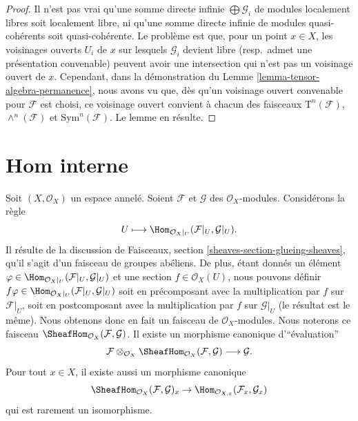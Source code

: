 \begin{proof}
Il n'est pas vrai qu'une somme directe infinie $\bigoplus \mathcal{G}_i$ de
modules localement libres soit localement libre, ni qu'une
somme directe infinie de modules quasi-cohérents
soit quasi-cohérente. Le problème est que, pour un
point $x \in X$, les voisinages ouverts $U_i$ de $x$ sur lesquels $\mathcal{G}_i$
devient libre (resp.\ admet une présentation convenable) peuvent avoir une intersection
qui n'est pas un voisinage ouvert de $x$. Cependant, dans la
démonstration du Lemme \ref{lemma-tensor-algebra-permanence}, nous avons vu que,
dès qu'un voisinage ouvert convenable pour $\mathcal{F}$ est choisi,
ce voisinage ouvert convient à chacun des faisceaux
$\text{T}^n(\mathcal{F})$, $\wedge^n(\mathcal{F})$ et
$\text{Sym}^n(\mathcal{F})$.
Le lemme en résulte.
\end{proof}







\section{Hom interne}
\label{section-internal-hom}

\noindent
Soit $(X, \mathcal{O}_X)$ un espace annelé.
Soient $\mathcal{F}$ et $\mathcal{G}$ des $\mathcal{O}_X$-modules.
Considérons la règle
$$
U \longmapsto \Hom_{\mathcal{O}_X|_U}(\mathcal{F}|_U, \mathcal{G}|_U).
$$
Il résulte de la discussion de Faisceaux, section
\ref{sheaves-section-glueing-sheaves}, qu'il s'agit d'un faisceau de
groupes abéliens. De plus, étant donnés un élément
$\varphi \in \Hom_{\mathcal{O}_X|_U}(\mathcal{F}|_U, \mathcal{G}|_U)$
et une section $f \in \mathcal{O}_X(U)$, nous pouvons définir
$f\varphi \in \Hom_{\mathcal{O}_X|_U}(\mathcal{F}|_U, \mathcal{G}|_U)$
soit en précomposant avec la multiplication par $f$ sur $\mathcal{F}|_U$,
soit en postcomposant avec la multiplication par $f$ sur $\mathcal{G}|_U$ (le résultat
est le même). Nous obtenons donc en fait un faisceau de $\mathcal{O}_X$-modules.
Nous noterons ce faisceau
$\SheafHom_{\mathcal{O}_X}(\mathcal{F}, \mathcal{G})$.
Il existe un morphisme canonique d'``évaluation''
$$
\mathcal{F}
\otimes_{\mathcal{O}_X}
\SheafHom_{\mathcal{O}_X}(\mathcal{F}, \mathcal{G})
\longrightarrow
\mathcal{G}.
$$
Pour tout $x \in X$, il existe aussi un morphisme canonique
$$
\SheafHom_{\mathcal{O}_X}(\mathcal{F}, \mathcal{G})_x
\to
\Hom_{\mathcal{O}_{X, x}}(\mathcal{F}_x, \mathcal{G}_x)
$$
qui est rarement un isomorphisme.

